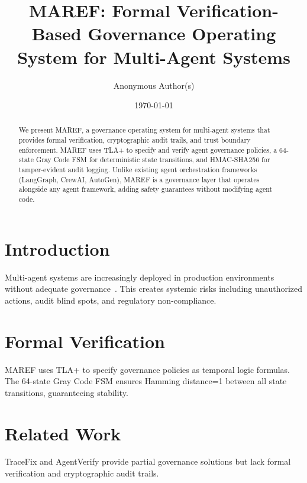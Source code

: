\title{MAREF: Formal Verification-Based Governance Operating System for Multi-Agent Systems}
\author{Anonymous Author(s)}
\date{\today}

\begin{abstract}
We present MAREF, a governance operating system for multi-agent systems
that provides formal verification, cryptographic audit trails, and
trust boundary enforcement. MAREF uses TLA+ to specify and verify
agent governance policies, a 64-state Gray Code FSM for deterministic
state transitions, and HMAC-SHA256 for tamper-evident audit logging.
Unlike existing agent orchestration frameworks (LangGraph, CrewAI,
AutoGen), MAREF is a governance layer that operates alongside any
agent framework, adding safety guarantees without modifying agent code.
\end{abstract}

\section{Introduction}
Multi-agent systems are increasingly deployed in production environments
without adequate governance~\cite{agent-safety-2024}. This creates
systemic risks including unauthorized actions, audit blind spots, and
regulatory non-compliance.

\section{Formal Verification}
MAREF uses TLA+ to specify governance policies as temporal logic formulas.
The 64-state Gray Code FSM ensures Hamming distance=1 between all
state transitions, guaranteeing stability.

\section{Related Work}
TraceFix and AgentVerify provide partial governance solutions but
lack formal verification and cryptographic audit trails.
